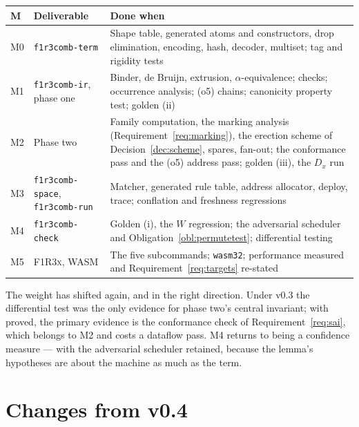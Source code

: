 \documentclass[11pt,a4paper]{article}
\newcommand{\code}[1]{\texttt{#1}}
\newcommand{\Fx}{\textsc{F1R3x}}
\theoremstyle{definition}
\theoremstyle{plain}
\begin{document}
\begin{center}
\begin{tabularx}{\linewidth}{@{}ll>{\raggedright\arraybackslash}X@{}}
\toprule
M & Deliverable & Done when\\
\midrule
M0 & \code{f1r3comb-term} & Shape table, generated atoms and constructors,
drop elimination, encoding, hash, decoder, multiset; tag and rigidity tests\\
M1 & \code{f1r3comb-ir}, phase one & Binder, de Bruijn, extrusion,
$\alpha$-equivalence; checks; occurrence analysis; (o5) chains; canonicity
property test; golden (ii)\\
M2 & Phase two & Family computation, the marking analysis
(Requirement~\ref{req:marking}), the erection scheme of
Decision~\ref{dec:scheme}, spares, fan-out; the
\cite[Def.~6.10]{draft3} conformance pass and the (o5) address pass; golden
(iii), the $D_{x}$ run\\
M3 & \code{f1r3comb-space}, \code{f1r3comb-run} & Matcher, generated rule
table, address allocator, deploy, trace; conflation and freshness regressions\\
M4 & \code{f1r3comb-check} & Golden (i), the $W$ regression; the adversarial
scheduler and Obligation~\ref{obl:permutetest}; differential testing\\
M5 & \Fx{}, WASM & The five subcommands; \code{wasm32}; performance measured
and Requirement~\ref{req:targets} re-stated\\
\bottomrule
\end{tabularx}
\end{center}

\noindent
The weight has shifted again, and in the right direction. Under v0.3 the
differential test was the only evidence for phase two's central invariant;
with \cite[Lem.~6.11]{draft3} proved, the primary evidence is the conformance
check of Requirement~\ref{req:sai}, which belongs to M2 and costs a dataflow
pass. M4 returns to being a confidence measure --- with the adversarial
scheduler retained, because the lemma's hypotheses are about the machine as
much as the term.

\section{Changes from v0.4}\label{sec:v4delta}
\end{document}
